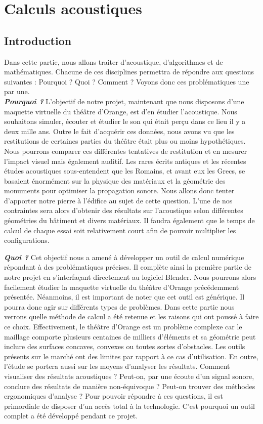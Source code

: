 \part{Calculs acoustiques}
	\chapter*{Introduction}
Dans cette partie, nous allons traiter d'acoustique, d'algorithmes et de mathématiques. Chacune de ces disciplines permettra de répondre aux questions suivantes : Pourquoi ? Quoi ? Comment ? Voyons donc ces problématiques une par une.\\

\textit{\textbf{Pourquoi ?}} L'objectif de notre projet, maintenant que nous disposons d'une maquette virtuelle du théâtre d'Orange, est d'en étudier l'acoustique. Nous souhaitons  simuler, écouter et étudier le son qui était perçu dans ce lieu il y a deux mille ans. Outre le fait d'acquérir ces données, nous avons vu que les restitutions de certaines parties du théâtre était plus ou moins hypothétiques. Nous pourrons comparer ces différentes tentatives de restitution et en mesurer l'impact visuel mais également auditif. Les rares écrits antiques et les récentes études acoustiques sous-entendent que les Romains, et avant eux les Grecs, se basaient énormément sur la physique des matériaux et la géométrie des monuments pour optimiser la propagation sonore. Nous allons donc tenter d'apporter notre pierre à l'édifice au sujet de cette question. L'une de nos contraintes sera alors d'obtenir des résultats sur l'acoustique selon différentes géométries du bâtiment et divers matériaux. Il faudra également que le temps de calcul de chaque essai soit relativement court afin de pouvoir multiplier les configurations.

\textit{\textbf{Quoi ?}} Cet objectif nous a amené à développer un outil de calcul numérique répondant à des problématiques précises. Il complète ainsi la première partie de notre projet en s'interfaçant directement au logiciel Blender. Nous pourrons alors facilement étudier la maquette virtuelle du théâtre d'Orange précédemment présentée. Néanmoins, il est important de noter que cet outil est générique. Il pourra donc agir sur différents types de problèmes. Dans cette partie nous verrons quelle méthode de calcul a été retenue et les raisons qui ont poussé à faire ce choix. Effectivement, le théâtre d'Orange est un problème complexe car le maillage comporte plusieurs centaines de milliers d'éléments et sa géométrie peut inclure des surfaces concaves, convexes ou toutes sortes d'obstacles. Les outils présents sur le marché ont des limites par rapport à ce cas d'utilisation. En outre, l'étude se portera aussi sur les moyens d'analyser les résultats. Comment visualiser des résultats acoustiques ? Peut-on, par une écoute d'un signal sonore, conclure des résultats de manière non-équivoque ? Peut-on trouver des méthodes ergonomiques d'analyse ? Pour pouvoir répondre à ces questions, il est primordiale de disposer d'un accès total à la technologie. C'est pourquoi un outil complet a été développé pendant ce projet.


